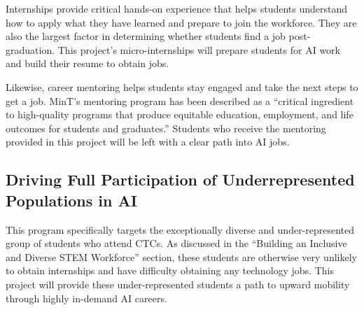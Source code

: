 Internships provide critical hands-on experience that helps students understand how to apply what they have learned and prepare to join the workforce. They are also the largest factor in determining whether students find a job post-graduation.\cite{callananAssessingRoleInternships2004,jonesTransformingCurriculumPreparing2002,knouseRelationCollegeInternships1999,saltikoffPositiveImplicationsInternships2017,stepanovaHiringCSGraduates2021} This project's micro-internships will prepare students for AI work and build their resume to obtain jobs.

Likewise, career mentoring helps students stay engaged and take the next steps to get a job. MinT's mentoring program has been described as a ``critical ingredient to high-quality programs that produce equitable education, employment, and life outcomes for students and graduates.''\cite{bragg20PromisingPractices} Students who receive the mentoring provided in this project will be left with a clear path into AI jobs.

\subsection{Driving Full Participation of Underrepresented Populations in AI}

This program specifically targets the exceptionally diverse and under-represented group of students who attend CTCs. As discussed in the ``Building an Inclusive and Diverse STEM Workforce'' section, these students are otherwise very unlikely to obtain internships and have difficulty obtaining any technology jobs. This project will provide these under-represented students a path to upward mobility through highly in-demand AI careers.